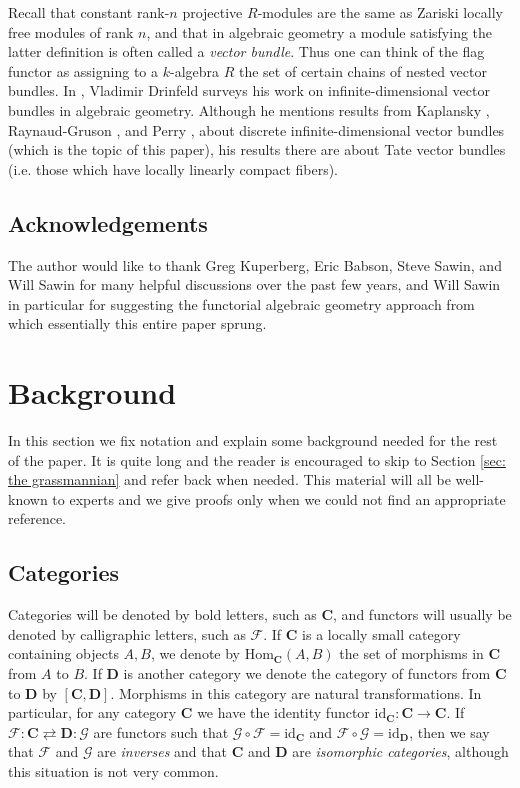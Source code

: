 \documentclass[oneside,11pt]{amsart}
\newcommand{\bC}{\ensuremath{\textbf{C}}}
\newcommand{\bD}{\ensuremath{\textbf{D}}}
\newcommand{\mF}{\ensuremath{\mathcal{F}}}
\newcommand{\mG}{\ensuremath{\mathcal{G}}}
\newcommand{\Hom}{\ensuremath{\text{Hom}}}
\newcommand{\id}{\ensuremath{\text{id}}}
\theoremstyle{definition}
\newtheorem{proof techniques}{Proof Techniques}
\begin{document}
Recall that constant rank-$n$ projective $R$-modules are the same as Zariski locally free modules of rank $n$, and that in algebraic geometry a module satisfying the latter definition is often called a \emph{vector bundle}. Thus one can think of the flag functor as assigning to a $k$-algebra $R$ the set of certain chains of nested vector bundles. In \cite{drinfeld2006}, Vladimir Drinfeld surveys his work on infinite-dimensional vector bundles in algebraic geometry. Although he mentions results from Kaplansky \cite{kaplansky1958}, Raynaud-Gruson \cite{raynaud-gruson1971}, and Perry \cite{perry2010}, about discrete infinite-dimensional vector bundles (which is the topic of this paper), his results there are about Tate vector bundles (i.e. those which have locally linearly compact fibers). 

\subsection{Acknowledgements}

The author would like to thank Greg Kuperberg, Eric Babson, Steve Sawin, and Will Sawin for many helpful discussions over the past few years, and Will Sawin in particular for suggesting the functorial algebraic geometry approach from which essentially this entire paper sprung. 



\section{Background}

In this section we fix notation and explain some background needed for the rest of the paper. It is quite long and the reader is encouraged to skip to Section \ref{sec: the grassmannian} and refer back when needed. This material will all be well-known to experts and we give proofs only when we could not find an appropriate reference. 

\subsection{Categories}
Categories will be denoted by bold letters, such as $\bC$, and functors will usually be denoted by calligraphic letters, such as $\mF$. If $\bC$ is a locally small category containing objects $A , B$, we denote by $\Hom_\bC(A , B)$ the set of morphisms in $\bC$ from $A$ to $B$. If $\bD$ is another category we denote the category of functors from $\bC$ to $\bD$ by $[\bC , \bD]$. Morphisms in this category are natural transformations. In particular, for any category $\bC$ we have the identity functor $\id_\bC : \bC \to \bC$. If $\mF : \bC \rightleftarrows \bD: \mG$ are functors such that $\mG \circ \mF = \id_\bC$ and $\mF\circ \mG = \id_\bD$, then we say that $\mF$ and $\mG$ are \emph{inverses} and that $\bC$ and $\bD$ are \emph{isomorphic categories}, although this situation is not very common. 
\end{document}
